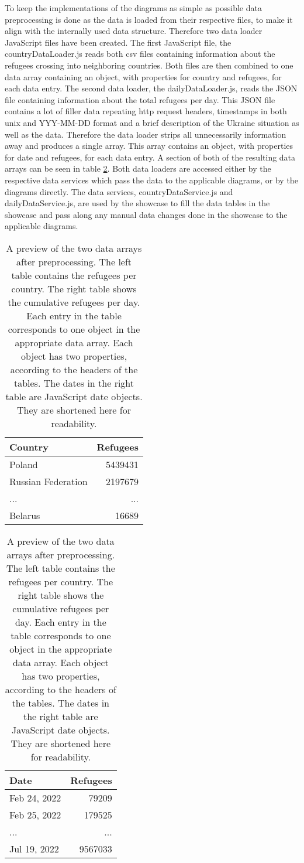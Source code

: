 To keep the implementations of the diagrams as simple as possible data preprocessing is done as the data is loaded from their respective files, to make it align with the internally used data structure. Therefore two data loader JavaScript files have been created. The first JavaScript file, the countryDataLoader.js reads both csv files containing information about the refugees crossing into neighboring countries. Both files are then combined to one data array containing an object, with properties for country and refugees, for each data entry. The second data loader, the dailyDataLoader.js, reads the JSON file containing information about the total refugees per day. This JSON file contains a lot of filler data repeating http request headers, timestamps in both unix and YYY-MM-DD format and a brief description of the Ukraine situation as well as the data. Therefore the data loader strips all unnecessarily information away and produces a single array. This array contains an object, with properties for date and refugees, for each data entry. A section of both of the resulting data arrays can be seen in table \ref{tab:data}. Both data loaders are accessed either by the respective data services which pass the data to the applicable diagrams, or by the diagrams directly. The data services, countryDataService.js and dailyDataService.js, are used by the showcase to fill the data tables in the showcase and pass along any manual data changes done in the showcase to the applicable diagrams.

\begin{table}[ht]
    \centering
    \begin{tabular}{l|r}
        Country & Refugees \\
        \hline \hline
        Poland & 5439431 \\
        Russian Federation & 2197679 \\
        ... & ... \\
        Belarus & 16689 \\
    \end{tabular}
    \quad
    \begin{tabular}{l|r}
        Date & Refugees \\
        \hline \hline
        Feb 24, 2022 & 79209 \\
        Feb 25, 2022 & 179525 \\
        ... & ... \\
        Jul 19, 2022 & 9567033 \\
    \end{tabular}
    \captionsetup{width=0.9\textwidth}
    \caption{A preview of the two data arrays after preprocessing. The left table contains the refugees per country. The right table shows the cumulative refugees per day. Each entry in the table corresponds to one object in the appropriate data array. Each object has two properties, according to the headers of the tables. The dates in the right table are JavaScript date objects. They are shortened here for readability.}
    \label{tab:data}
\end{table}


